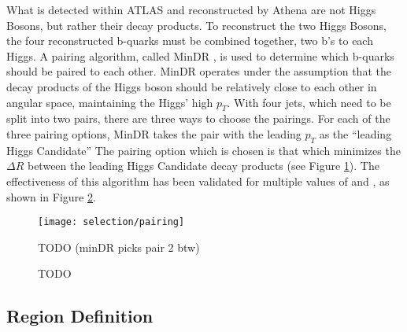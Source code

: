         What is detected within ATLAS and reconstructed by Athena are not Higgs Bosons, but rather their decay products.
        To reconstruct the two Higgs Bosons, the four reconstructed b-quarks must be combined together, two b's to each Higgs.
        A pairing algorithm, called MinDR \cite{hh4b_2021_int_note},
            is used to determine which b-quarks should be paired to each other.
        MinDR operates under the assumption that the decay products of the Higgs boson
            should be relatively close to each other in angular space, maintaining the Higgs' high $p_T$.
        With four jets, which need to be split into two pairs, there are three ways to choose the pairings.
        For each of the three pairing options, MinDR takes the pair with the leading $p_T$ as the ``leading Higgs Candidate''
        The pairing option which is chosen is that which minimizes the $\Delta R$ between the leading Higgs Candidate decay products
            (see Figure \ref{fig:minDR_pairing_diagram}).
        The effectiveness of this algorithm has been validated for multiple values of \kvv and \kl,
            as shown in Figure \ref{fig:HHpairing}.

        \begin{figure}[tbh]
            \texttt{[image: selection/pairing]}
            \caption{
                TODO (minDR picks pair 2 btw)\cite{hh4b_2021_int_note}
            }
            \label{fig:minDR_pairing_diagram}
        \end{figure}

        \begin{figure}[hbt]
            \centering
            \caption{TODO \cite{hh4b_2021_int_note}}
            \label{fig:HHpairing}
        \end{figure}
                                                                                                         
        \FloatBarrier


    \subsection{Region Definition}
        
